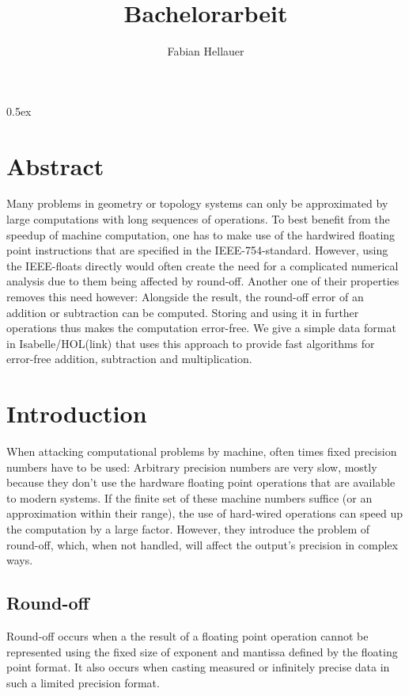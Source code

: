 \documentclass[11pt,a4paper]{article}
\begin{document}
\title{Bachelorarbeit}
\author{Fabian Hellauer}
\maketitle

\tableofcontents

\parindent 0pt\parskip 0.5ex

\section{Abstract}

Many problems in geometry or topology systems can only be approximated by large computations with long sequences of operations. To best benefit from the speedup of machine computation, one has to make use of the hardwired floating point instructions that are specified in the IEEE-754-standard. However, using the IEEE-floats directly would often create the need for a complicated numerical analysis due to them being affected by round-off.
Another one of their properties removes this need however: Alongside the result, the round-off error of an addition or subtraction can be computed. Storing and using it in further operations thus makes the computation error-free.
We give a simple data format in Isabelle/HOL(link) that uses this approach to provide fast algorithms for error-free addition, subtraction and multiplication.

\section{Introduction}

When attacking computational problems by machine, often times fixed precision numbers have to be used: Arbitrary precision numbers are very slow, mostly because they don't use the hardware floating point operations that are available to modern systems. If the finite set of these machine numbers suffice (or an approximation within their range), the use of hard-wired operations can speed up the computation by a large factor. However, they introduce the problem of round-off, which, when not handled, will affect the output's precision in complex ways.

\subsection{Round-off}
Round-off occurs when a the result of a floating point operation cannot be represented using the fixed size of exponent and mantissa defined by the floating point format. It also occurs when casting measured or infinitely precise data in such a limited precision format.
\end{document}

